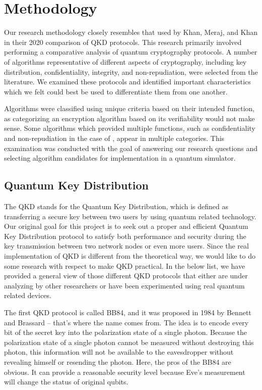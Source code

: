 \documentclass[sigconf]{acmart}
\begin{document}
\section{Methodology}
Our research methodology closely resembles that used by Khan, Meraj, and Khan in their 2020 comparison of QKD protocols\cite{khan_security_2020}. This research primarily involved performing a comparative analysis of quantum cryptography protocols. A number of algorithms representative of different aspects of cryptography, including key distribution, confidentiality, integrity, and non-repudiation, were selected from the literature. We examined these protocols and identified important characteristics which we felt could best be used to differentiate them from one another.

Algorithms were classified using unique criteria based on their intended function, as categorizing an encryption algorithm based on its verifiability would not make sense. Some algorithms which provided multiple functions, such as confidentiality and non-repudiation in the case of \cite{amerimehr_quantum_2018}, appear in multiple categories. This examination was conducted with the goal of answering our research questions and selecting algorithm candidates for implementation in a quantum simulator.

\subsection{Quantum Key Distribution}
The QKD stands for the Quantum Key Distribution, which is defined as transferring a secure key between two users by using quantum related technology\cite{khan_security_2020}. Our original goal for this project is to seek out a proper and efficient Quantum Key Distribution protocol to satisfy both performance and security during the key transmission between two network nodes or even more users. Since the real implementation of QKD is different from the theoretical way, we would like to do some research with respect to make QKD practical. In the below list, we have provided a general view of those different QKD protocols that either are under analyzing by other researchers or have been experimented using real quantum related devices.

The first QKD protocol is called BB84, and it was proposed in 1984 by Bennett and Brassard – that's where the name comes from. The idea is to encode every bit of the secret key into the polarization state of a single photon. Because the polarization state of a single photon cannot be measured without destroying this photon, this information will not be available to the eavesdropper without revealing himself or resending the photon. Here, the pros of the BB84 are obvious. It can provide a reasonable security level because Eve's measurement will change the status of original qubits.
 
\end{document}
